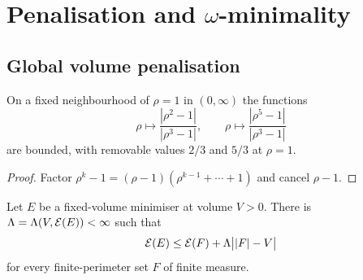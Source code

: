 \chapter{Penalisation and $\omega$-minimality}\label{ch:penalization}

\section{Global volume penalisation}

\begin{lemma}\label{lem:dilation-quotients}
On a fixed neighbourhood of $\rho=1$ in $(0,\infty)$ the functions
\[
  \rho\longmapsto\frac{|\rho^2-1|}{|\rho^3-1|},
  \qquad
  \rho\longmapsto\frac{|\rho^5-1|}{|\rho^3-1|}
\]
are bounded, with removable values $2/3$ and $5/3$ at $\rho=1$.
\end{lemma}

\begin{proof}
Factor $\rho^k-1=(\rho-1)(\rho^{k-1}+\cdots+1)$ and cancel $\rho-1$.
\end{proof}

\begin{lemma}\label{lem:penalization}
Let $E$ be a fixed-volume minimiser at volume $V>0$.  There is
$\Lambda=\Lambda(V,\mathcal E(E))<\infty$ such that
\begin{equation}\label{eq:penalization}
  \mathcal E(E)\le\mathcal E(F)+\Lambda\bigl||F|-V\bigr|
\end{equation}
for every finite-perimeter set $F$ of finite measure.
\end{lemma}

